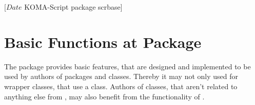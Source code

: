 %
%
%
%
%
%
%
%
% 
%
%
%
%

                 [$Date$
                  KOMA-Script package scrbase]


\chapter{Basic Functions at Package }

%

The package  provides basic features, that are designed and
implemented to be used by authors of packages and classes. Thereby it may not
only used for wrapper classes, that use a \KOMAScript{} class. Authors of
classes, that aren't related to anything else from \KOMAScript{}, may also
benefit from the functionality of .

